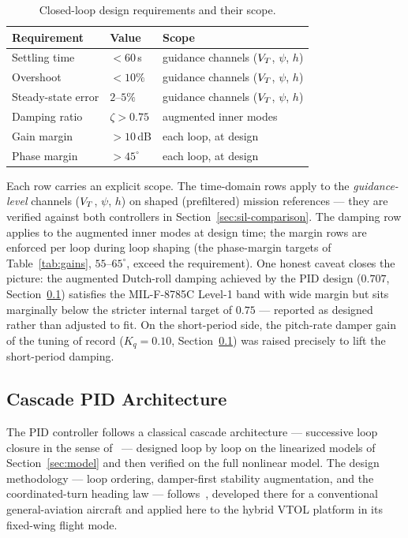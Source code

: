 \begin{table}[!t]
\caption{Closed-loop design requirements and their scope.}
\label{tab:requirements}
\centering
\begin{tabular}{lll}
\toprule
Requirement & Value & Scope \\
\midrule
Settling time & $<60$\,s & guidance channels ($V_T$, $\psi$, $h$) \\
Overshoot & $<10\%$ & guidance channels ($V_T$, $\psi$, $h$) \\
Steady-state error & $2$--$5\%$ & guidance channels ($V_T$, $\psi$, $h$) \\
Damping ratio & $\zeta>0.75$ & augmented inner modes \\
Gain margin & $>10$\,dB & each loop, at design \\
Phase margin & $>45^\circ$ & each loop, at design \\
\bottomrule
\end{tabular}
\end{table}

Each row carries an explicit scope. The time-domain rows apply to the
\emph{guidance-level} channels ($V_T$, $\psi$, $h$) on shaped
(prefiltered) mission references --- they are verified against both
controllers in Section~\ref{sec:sil-comparison}. The damping row
applies to the augmented inner modes at design time; the margin rows
are enforced per loop during loop shaping (the phase-margin targets of
Table~\ref{tab:gains}, $55$--$65^\circ$, exceed the requirement). One
honest caveat closes the picture: the augmented Dutch-roll damping
achieved by the PID design ($0.707$, Section~\ref{sec:pid}) satisfies
the MIL-F-8785C Level-1 band with wide margin but sits marginally
below the stricter internal target of $0.75$ --- reported as designed
rather than adjusted to fit. On the short-period side, the pitch-rate
damper gain of the tuning of record ($K_q=0.10$,
Section~\ref{sec:pid}) was raised precisely to lift the short-period
damping.

\subsection{Cascade PID Architecture}
\label{sec:pid}
The PID controller follows a classical cascade architecture ---
successive loop closure in the sense of~\cite{beard2012small} ---
designed loop by loop on the linearized models of
Section~\ref{sec:model} and then verified on the full nonlinear model.
The design methodology --- loop ordering, damper-first stability
augmentation, and the coordinated-turn heading law ---
follows~\cite{santos2018}, developed there for a conventional
general-aviation aircraft and applied here to the hybrid VTOL platform
in its fixed-wing flight mode.

